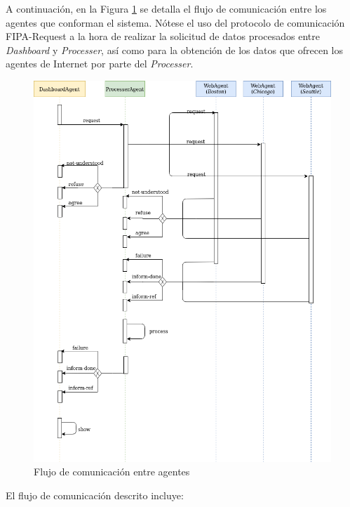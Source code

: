 \documentclass{estilo}
\begin{document}
    A continuación, en la Figura \ref{fig:fig3} se detalla el flujo de comunicación entre los agentes que conforman el sistema. Nótese el uso del protocolo de comunicación FIPA-Request a la hora de realizar la solicitud de datos procesados entre \textit{Dashboard} y \textit{Processer}, así como para la obtención de los datos que ofrecen los agentes de Internet por parte del \textit{Processer}.
    
    \begin{figure}[ht]
        \centering
        \includegraphics[scale=0.5]{images/diagrama-comunicacion.png} 
        \caption{Flujo de comunicación entre agentes}
        \label{fig:fig3}
    \end{figure}
    
    El flujo de comunicación descrito incluye:
    
\end{document}
